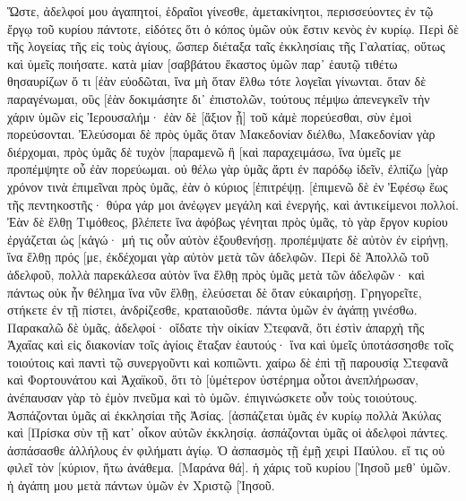 Ὥστε, ἀδελφοί μου ἀγαπητοί, ἑδραῖοι γίνεσθε, ἀμετακίνητοι, περισσεύοντες ἐν τῷ ἔργῳ τοῦ κυρίου πάντοτε, εἰδότες ὅτι ὁ κόπος ὑμῶν οὐκ ἔστιν κενὸς ἐν κυρίῳ. 
Περὶ δὲ τῆς λογείας τῆς εἰς τοὺς ἁγίους, ὥσπερ διέταξα ταῖς ἐκκλησίαις τῆς Γαλατίας, οὕτως καὶ ὑμεῖς ποιήσατε. 
κατὰ μίαν [σαββάτου ἕκαστος ὑμῶν παρ᾽ ἑαυτῷ τιθέτω θησαυρίζων ὅ τι [ἐὰν εὐοδῶται, ἵνα μὴ ὅταν ἔλθω τότε λογεῖαι γίνωνται. 
ὅταν δὲ παραγένωμαι, οὓς [ἐὰν δοκιμάσητε δι᾽ ἐπιστολῶν, τούτους πέμψω ἀπενεγκεῖν τὴν χάριν ὑμῶν εἰς Ἰερουσαλήμ· 
ἐὰν δὲ [ἄξιον ᾖ] τοῦ κἀμὲ πορεύεσθαι, σὺν ἐμοὶ πορεύσονται. 
Ἐλεύσομαι δὲ πρὸς ὑμᾶς ὅταν Μακεδονίαν διέλθω, Μακεδονίαν γὰρ διέρχομαι, 
πρὸς ὑμᾶς δὲ τυχὸν [παραμενῶ ἢ [καὶ παραχειμάσω, ἵνα ὑμεῖς με προπέμψητε οὗ ἐὰν πορεύωμαι. 
οὐ θέλω γὰρ ὑμᾶς ἄρτι ἐν παρόδῳ ἰδεῖν, ἐλπίζω [γὰρ χρόνον τινὰ ἐπιμεῖναι πρὸς ὑμᾶς, ἐὰν ὁ κύριος [ἐπιτρέψῃ. 
[ἐπιμενῶ δὲ ἐν Ἐφέσῳ ἕως τῆς πεντηκοστῆς· 
θύρα γάρ μοι ἀνέῳγεν μεγάλη καὶ ἐνεργής, καὶ ἀντικείμενοι πολλοί. 
Ἐὰν δὲ ἔλθῃ Τιμόθεος, βλέπετε ἵνα ἀφόβως γένηται πρὸς ὑμᾶς, τὸ γὰρ ἔργον κυρίου ἐργάζεται ὡς [κἀγώ· 
μή τις οὖν αὐτὸν ἐξουθενήσῃ. προπέμψατε δὲ αὐτὸν ἐν εἰρήνῃ, ἵνα ἔλθῃ πρός [με, ἐκδέχομαι γὰρ αὐτὸν μετὰ τῶν ἀδελφῶν. 
Περὶ δὲ Ἀπολλῶ τοῦ ἀδελφοῦ, πολλὰ παρεκάλεσα αὐτὸν ἵνα ἔλθῃ πρὸς ὑμᾶς μετὰ τῶν ἀδελφῶν· καὶ πάντως οὐκ ἦν θέλημα ἵνα νῦν ἔλθῃ, ἐλεύσεται δὲ ὅταν εὐκαιρήσῃ. 
Γρηγορεῖτε, στήκετε ἐν τῇ πίστει, ἀνδρίζεσθε, κραταιοῦσθε. 
πάντα ὑμῶν ἐν ἀγάπῃ γινέσθω. 
Παρακαλῶ δὲ ὑμᾶς, ἀδελφοί· οἴδατε τὴν οἰκίαν Στεφανᾶ, ὅτι ἐστὶν ἀπαρχὴ τῆς Ἀχαΐας καὶ εἰς διακονίαν τοῖς ἁγίοις ἔταξαν ἑαυτούς· 
ἵνα καὶ ὑμεῖς ὑποτάσσησθε τοῖς τοιούτοις καὶ παντὶ τῷ συνεργοῦντι καὶ κοπιῶντι. 
χαίρω δὲ ἐπὶ τῇ παρουσίᾳ Στεφανᾶ καὶ Φορτουνάτου καὶ Ἀχαϊκοῦ, ὅτι τὸ [ὑμέτερον ὑστέρημα οὗτοι ἀνεπλήρωσαν, 
ἀνέπαυσαν γὰρ τὸ ἐμὸν πνεῦμα καὶ τὸ ὑμῶν. ἐπιγινώσκετε οὖν τοὺς τοιούτους. 
Ἀσπάζονται ὑμᾶς αἱ ἐκκλησίαι τῆς Ἀσίας. [ἀσπάζεται ὑμᾶς ἐν κυρίῳ πολλὰ Ἀκύλας καὶ [Πρίσκα σὺν τῇ κατ᾽ οἶκον αὐτῶν ἐκκλησίᾳ. 
ἀσπάζονται ὑμᾶς οἱ ἀδελφοὶ πάντες. ἀσπάσασθε ἀλλήλους ἐν φιλήματι ἁγίῳ. 
Ὁ ἀσπασμὸς τῇ ἐμῇ χειρὶ Παύλου. 
εἴ τις οὐ φιλεῖ τὸν [κύριον, ἤτω ἀνάθεμα. [Μαράνα θά]. 
ἡ χάρις τοῦ κυρίου [Ἰησοῦ μεθ᾽ ὑμῶν. 
ἡ ἀγάπη μου μετὰ πάντων ὑμῶν ἐν Χριστῷ [Ἰησοῦ. 
